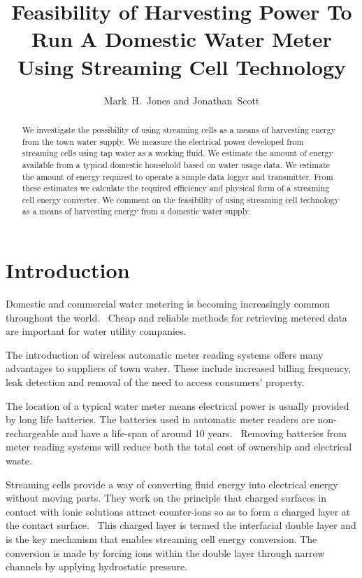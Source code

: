 \documentclass[10pt,final,journal]{IEEEtran}
\title{Feasibility of Harvesting Power To Run A Domestic Water Meter Using Streaming Cell Technology}
\author{Mark~H.~Jones and Jonathan~Scott}
\begin{document}
    \maketitle

    \begin{abstract}
        We investigate the possibility of using streaming cells as a means of harvesting energy from the town water supply.
        We measure the electrical power developed from streaming cells using tap water as a working fluid.
        We estimate the amount of energy available from a typical domestic household based on water usage data.
        We estimate the amount of energy required to operate a simple data logger and transmitter.
        From these estimates we calculate the required efficiency and physical form of a streaming cell energy converter.
        We comment on the feasibility of using streaming cell technology as a means of harvesting energy from a domestic water supply.
    \end{abstract}

    \section{Introduction}
    \label{sect:Introduction}
    Domestic and commercial water metering is becoming increasingly common throughout the world.~\cite{Chang2012}
    Cheap and reliable methods for retrieving metered data are important for water utility companies.

    The introduction of wireless automatic meter reading systems offers many advantages to suppliers of town water.
    These include increased billing frequency, leak detection and removal of the need to access consumers' property.~\cite{Chang2012,Britton2013}

    The location of a typical water meter means electrical power is usually provided by long life batteries.
    The batteries used in automatic meter readers are non-rechargeable and have a life-span of around 10 years.~\cite{BMeters2014}
    Removing batteries from meter reading systems will reduce both the total cost of ownership and electrical waste.

    Streaming cells provide a way of converting fluid energy into electrical energy without moving parts.
    They work on the principle that charged surfaces in contact with ionic solutions attract counter-ions so as to form a charged layer at the contact surface.~\cite{Stein2004}
    This charged layer is termed the interfacial double layer and is the key mechanism that enables streaming cell energy conversion.
    The conversion is made by forcing ions within the double layer through narrow channels by applying hydrostatic pressure.
\end{document}
